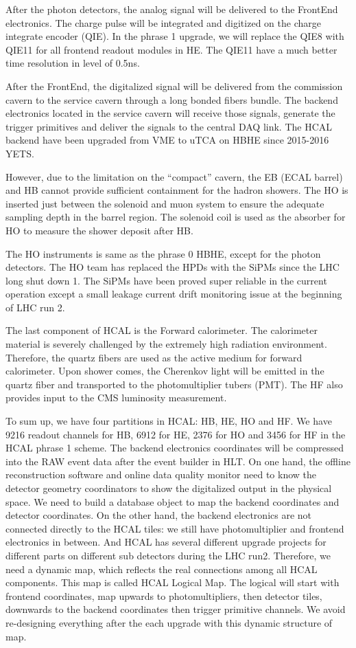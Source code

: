 After the photon detectors, the analog signal will be delivered to the FrontEnd electronics. The charge pulse will be integrated and digitized on the charge integrate encoder (QIE). In the phrase 1 upgrade, we will replace the QIE8 with QIE11 for all frontend readout modules in HE. The QIE11 have a much better time resolution in level of 0.5ns. 

After the FrontEnd, the digitalized signal will be delivered from the commission cavern to the service cavern through a long bonded fibers bundle. The backend electronics located in the service cavern will receive those signals, generate the trigger primitives and deliver the signals to the central DAQ link. The HCAL backend have been upgraded from VME to uTCA on HBHE since 2015-2016 YETS. 

However, due to the limitation on the “compact” cavern, the EB (ECAL barrel) and HB cannot provide sufficient containment for the hadron showers. The HO is inserted just between the solenoid and muon system to ensure the adequate sampling depth in the barrel region. The solenoid coil is used as the absorber for HO to measure the shower deposit after HB. 

The HO instruments is same as the phrase 0 HBHE, except for the photon detectors. The HO team has replaced the HPDs with the SiPMs since the LHC long shut down 1. The SiPMs have been proved super reliable in the current operation except a small leakage current drift monitoring issue at the beginning of LHC run 2. 

The last component of HCAL is the Forward calorimeter. The calorimeter material is severely challenged by the extremely high radiation environment. Therefore, the quartz fibers are used as the active medium for forward calorimeter. Upon shower comes, the Cherenkov light will be emitted in the quartz fiber and transported to the photomultiplier tubers (PMT). The HF also provides input to the CMS luminosity measurement. 

To sum up, we have four partitions in HCAL: HB, HE, HO and HF. We have 9216 readout channels for HB, 6912 for HE, 2376 for HO and 3456 for HF in the HCAL phrase 1 scheme. The backend electronics coordinates will be compressed into the RAW event data after the event builder in HLT. On one hand, the offline reconstruction software and online data quality monitor need to know the detector geometry coordinators to show the digitalized output in the physical space. We need to build a database object to map the backend coordinates and detector coordinates. On the other hand, the backend electronics are not connected directly to the HCAL tiles: we still have photomultiplier and frontend electronics in between. And HCAL has several different upgrade projects for different parts on different sub detectors during the LHC run2. Therefore, we need a dynamic map, which reflects the real connections among all HCAL components. This map is called HCAL Logical Map. The logical will start with frontend coordinates, map upwards to photomultipliers, then detector tiles, downwards to the backend coordinates then trigger primitive channels. We avoid re-designing everything after the each upgrade with this dynamic structure of map. 

